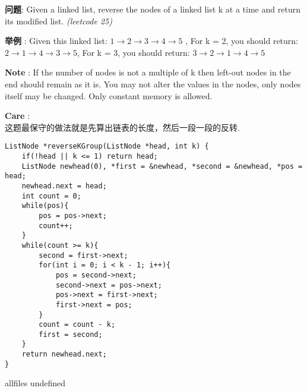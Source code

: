 \documentclass{article}
\begin{document}
\begin{CJK}{UTF8}{gbsn}     %

\else
    
\begin{description}
    \item{\textbf{问题}}: Given a linked list, reverse the nodes of a linked list k at a time and return its modified list. \textit{(leetcode 25)}
    \item{\textbf{举例}} : Given this linked list: $1\rightarrow2\rightarrow3\rightarrow4\rightarrow5$ , For k = 2, you should return: $2\rightarrow1\rightarrow4\rightarrow3\rightarrow5$, For k = 3, you should return: $3\rightarrow2\rightarrow1\rightarrow4\rightarrow5$
    \item{\textbf{Note}} : If the number of nodes is not a multiple of k then left-out nodes in the end should remain as it is. You may not alter the values in the nodes, only nodes itself may be changed. Only constant memory is allowed.
    \item{\textbf{Care}} : 
    \\这题最保守的做法就是先算出链表的长度，然后一段一段的反转.
    \begin{lstlisting}
ListNode *reverseKGroup(ListNode *head, int k) {
	if(!head || k <= 1)	return head;
	ListNode newhead(0), *first = &newhead, *second = &newhead, *pos = head;
	newhead.next = head;
	int count = 0;
	while(pos){
		pos = pos->next;
		count++;
	}
	while(count >= k){
		second = first->next;
		for(int i = 0; i < k - 1; i++){
			pos = second->next;
			second->next = pos->next;
			pos->next = first->next;
			first->next = pos;
		}
		count = count - k;
		first = second;
	}
	return newhead.next;
}
    \end{lstlisting}
\end{description}

\fi

\ifx allfiles undefined
\end{CJK}
\end{document}

